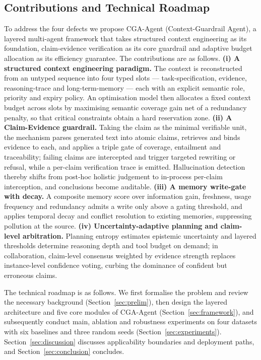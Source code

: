 \documentclass[journal,10pt,a4paper]{IEEEtran}
\begin{document}
\subsection{Contributions and Technical Roadmap}
To address the four defects we propose CGA-Agent (Context-Guardrail Agent), a layered multi-agent framework that takes structured context engineering as its foundation, claim-evidence verification as its core guardrail and adaptive budget allocation as its efficiency guarantee. The contributions are as follows. \textbf{(i) A structured context engineering paradigm.} The context is reconstructed from an untyped sequence into four typed slots --- task-specification, evidence, reasoning-trace and long-term-memory --- each with an explicit semantic role, priority and expiry policy. An optimisation model then allocates a fixed context budget across slots by maximising semantic coverage gain net of a redundancy penalty, so that critical constraints obtain a hard reservation zone. \textbf{(ii) A Claim-Evidence guardrail.} Taking the claim as the minimal verifiable unit, the mechanism parses generated text into atomic claims, retrieves and binds evidence to each, and applies a triple gate of coverage, entailment and traceability; failing claims are intercepted and trigger targeted rewriting or refusal, while a per-claim verification trace is emitted. Hallucination detection thereby shifts from post-hoc holistic judgement to in-process per-claim interception, and conclusions become auditable. \textbf{(iii) A memory write-gate with decay.} A composite memory score over information gain, freshness, usage frequency and redundancy admits a write only above a gating threshold, and applies temporal decay and conflict resolution to existing memories, suppressing pollution at the source. \textbf{(iv) Uncertainty-adaptive planning and claim-level arbitration.} Planning entropy estimates epistemic uncertainty and layered thresholds determine reasoning depth and tool budget on demand; in collaboration, claim-level consensus weighted by evidence strength replaces instance-level confidence voting, curbing the dominance of confident but erroneous claims.

The technical roadmap is as follows. We first formalise the problem and review the necessary background (Section~\ref{sec:prelim}), then design the layered architecture and five core modules of CGA-Agent (Section~\ref{sec:framework}), and subsequently conduct main, ablation and robustness experiments on four datasets with six baselines and three random seeds (Section~\ref{sec:experiments}). Section~\ref{sec:discussion} discusses applicability boundaries and deployment paths, and Section~\ref{sec:conclusion} concludes.
\end{document}
